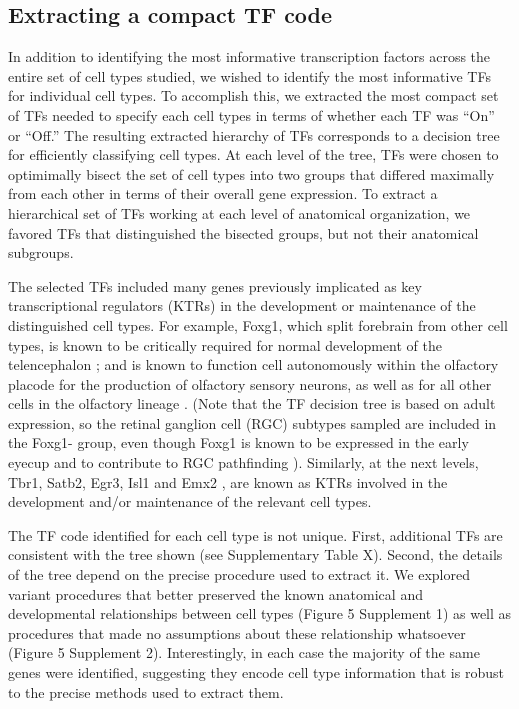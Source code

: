 \subsection{Extracting a compact TF code}
In addition to identifying the most informative transcription factors across the entire set of cell types studied, we wished to identify the most informative TFs for individual cell types. To accomplish this, we extracted the most compact set of TFs needed to specify each cell types in terms of whether each TF was “On” or “Off.” The resulting extracted hierarchy of TFs corresponds to a decision tree \cite{Saeys_2007} for efficiently classifying cell types\cite{Gabitto_2016}. At each level of the tree, TFs were chosen to optimimally bisect the set of cell types into two groups that differed maximally from each other in terms of their overall gene expression. To extract a hierarchical set of TFs working at each level of anatomical organization, we favored TFs that distinguished the bisected groups, but not their anatomical subgroups.

The selected TFs included many genes previously implicated as key transcriptional regulators (KTRs) in the development or maintenance of the distinguished cell types. For example, Foxg1, which split forebrain from other cell types, is known to be critically required for normal development of the telencephalon \cite{Xuan_1995}; \cite{Danesin_2012} and is known to function cell autonomously within the olfactory placode for the production of olfactory sensory neurons, as well as for all other cells in the olfactory lineage \cite{Duggan_2008}. (Note that the TF decision tree is based on adult expression, so the retinal ganglion cell (RGC) subtypes sampled are included in the Foxg1- group, even though Foxg1 is known to be expressed in the early eyecup and to contribute to RGC pathfinding \cite{Schulte_2005}). Similarly, at the next levels,  Tbr1\cite{Bedogni_2010}, Satb2\cite{Sweeney_2017}, Egr3\cite{Chandra_2015}, Isl1\cite{Lu_2013} and Emx2 \cite{Zhang_2016}, are known as KTRs involved in the development and/or maintenance of the relevant cell types.

The TF code identified for each cell type is not unique. First, additional TFs are consistent with the tree shown (see Supplementary Table X). Second, the details of the tree depend on the precise procedure used to extract it. We explored variant procedures that better preserved the known anatomical and developmental relationships between cell types (Figure 5 Supplement 1) as well as procedures that made no assumptions about these relationship whatsoever (Figure 5 Supplement 2). Interestingly, in each case the majority of the same genes were identified, suggesting they encode cell type information that is robust to the precise methods used to extract them.


